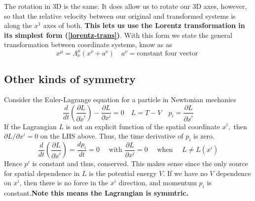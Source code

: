 The rotation in 3D is the same. It does allow us to rotate our 3D axes, however, so that the relative velocity between our original and transformed systems is along the $x^1$ axes of both. \textbf{This lets us use the Lorentz transformation in its simplest form (\ref{lorentz-trans})}. With this form we state the general transformation between coordinate systems, know as  as
\begin{equation}
x^{\mu}=\Lambda_{\nu}^{\mu}\left(x^{\nu}+a^{\nu}\right) \quad a^{\nu}=\mathrm{constant} \text { four vector }
\label{poincare-trans}
\end{equation}

\subsection{Other kinds of symmetry}
Consider the Euler-Lagrange equation for a particle in Newtonian mechanics
$$
\frac{d}{d t}\left(\frac{\partial L}{\partial \dot{x}^{i}}\right)-\frac{\partial L}{\partial x^{i}}=0 \quad L=T-V \quad p_{i}=\frac{\partial L}{\partial \dot{x}^{i}}
$$
If the Lagrangian $L$ is not an explicit function of the spatial coordinate $x^i,$ then $\partial L / \partial x^{i}=0$ on the LHS above. Thus, the time derivative of $p_{i}$ is zero.
$$
\frac{d}{d t}\left(\frac{\partial L}{\partial \dot{x}^{i}}\right)=\frac{d p_{i}}{d t}=0 \quad \text { with } \frac{\partial L}{\partial x^{i}}=0 \quad \text { when } \quad L \neq L\left(x^{i}\right)
$$
Hence $p^i$ is constant and thus, conserved. This makes sense since the only source for spatial dependence in $L$ is the potential energy $V$. If we have no $V$ dependence on $x^i$, then there is no force in the $x^i$ direction, and momentum $p_i$ is constant.\textbf{Note this means the Lagrangian is symmtric.}

